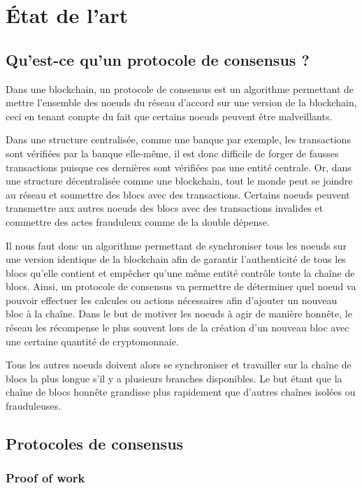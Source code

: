 \chapter{État de l'art}
\label{ch:etat_art}

\section{Qu'est-ce qu'un protocole de consensus ?}

Dans une blockchain, un protocole de consensus est un algorithme permettant de mettre l'ensemble des noeuds du réseau d'accord sur une version de la blockchain, ceci en tenant compte du fait que certains noeuds peuvent être malveillants.

Dans une structure centralisée, comme une banque par exemple, les transactions sont vérifiées par la banque elle-même, il est donc difficile de forger de fausses transactions puisque ces dernières sont vérifiées pas une entité centrale. Or, dans une structure décentralisée comme une blockchain, tout le monde peut se joindre au réseau et soumettre des blocs avec des transactions. Certains noeuds peuvent transmettre aux autres noeuds des blocs avec des transactions invalides et commettre des actes frauduleux comme de la double dépense.

Il nous faut donc un algorithme permettant de synchroniser tous les noeuds sur une version identique de la blockchain afin de garantir l'authenticité de tous les blocs qu'elle contient et empêcher qu'une même entité contrôle toute la chaîne de blocs. Ainsi, un protocole de consensus va permettre de déterminer quel noeud va pouvoir effectuer les calcules ou actions nécessaires afin d'ajouter un nouveau bloc à la chaîne. Dans le but de motiver les noeuds à agir de manière honnête, le réseau les récompense le plus souvent lors de la création d'un nouveau bloc avec une certaine quantité de cryptomonnaie. 

Tous les autres noeuds doivent alors se synchroniser et travailler sur la chaîne de blocs la plus longue s'il y a plusieurs branches disponibles. Le but étant que la chaîne de blocs honnête grandisse plus rapidement que d'autres chaînes isolées ou frauduleuses.

\section{Protocoles de consensus}

\subsection{Proof of work}
\label{consensus:pow}

